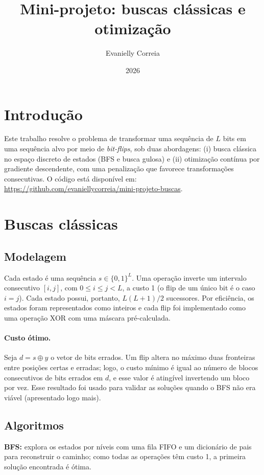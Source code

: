 \documentclass[11pt,a4paper]{article}
\title{Mini-projeto: buscas clássicas e otimização}
\author{Evanielly Correia}
\date{2026}
\begin{document}
\maketitle

\section{Introdução}
Este trabalho resolve o problema de transformar uma sequência de $L$ bits em uma sequência alvo por meio de \emph{bit-flips}, sob duas abordagens: (i) busca clássica no espaço discreto de estados (BFS e busca gulosa) e (ii) otimização contínua por gradiente descendente, com uma penalização que favorece transformações consecutivas. O código está disponível em: \url{https://github.com/evaniellycorreia/mini-projeto-buscas}.

\section{Buscas clássicas}
\subsection{Modelagem}
Cada estado é uma sequência $s\in\{0,1\}^L$. Uma operação inverte um intervalo consecutivo $[i,j]$, com $0\le i\le j<L$, a custo 1 (o flip de um único bit é o caso $i=j$). Cada estado possui, portanto, $L(L+1)/2$ sucessores. Por eficiência, os estados foram representados como inteiros e cada flip foi implementado como uma operação XOR com uma máscara pré-calculada.

\paragraph{Custo ótimo.} Seja $d=s\oplus y$ o vetor de bits errados. Um flip altera no máximo duas fronteiras entre posições certas e erradas; logo, o custo mínimo é igual ao número de blocos consecutivos de bits errados em $d$, e esse valor é atingível invertendo um bloco por vez. Esse resultado foi usado para validar as soluções quando o BFS não era viável (apresentado logo mais).

\subsection{Algoritmos}
\textbf{BFS:} explora os estados por níveis com uma fila FIFO e um dicionário de pais para reconstruir o caminho; como todas as operações têm custo 1, a primeira solução encontrada é ótima.
\end{document}
